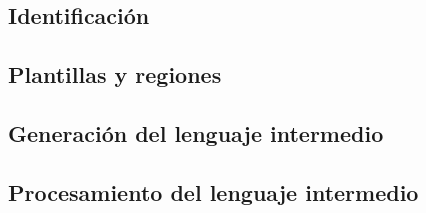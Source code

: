 


\subsection{Identificación}


\subsection{Plantillas y regiones}

\subsection{Generación del lenguaje intermedio}

\subsection{Procesamiento del lenguaje intermedio}

